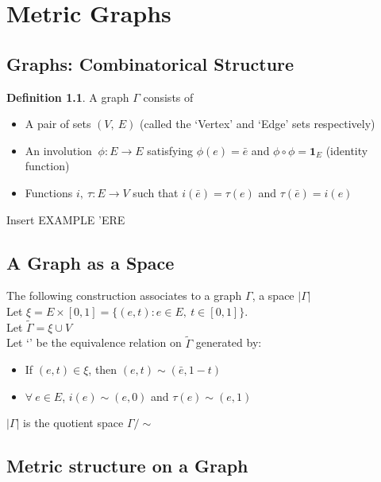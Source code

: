 \documentclass[a4paper,10pt]{book}
\theoremstyle{definition}
\newtheorem{definition}[theorem]{Definition}
\theoremstyle{remark}
\numberwithin{section}{chapter}
\numberwithin{equation}{chapter}
\begin{document}
 
 \chapter{Metric Graphs}
 \section{Graphs: Combinatorical Structure}
 
 \begin{definition}
  A graph \emph{$\Gamma$} consists of
  
  \begin{itemize}
   \item A pair of sets $(V,\ E)$ (called the `Vertex' and `Edge' sets respectively)
   \item An involution  $\: \phi \colon E \rightarrow E$
               satisfying $\phi (e) = \bar{e} $ and $\phi\circ\phi = \mathbf{1}_E$ (identity function)
   \item Functions $i,\ \tau: E \rightarrow V$ such that $i(\bar{e}) = \tau (e) $ and $\tau(\bar{e}) = i(e)$
  \end{itemize}

 \end{definition}

 Insert EXAMPLE 'ERE
 
 \section{A Graph as a Space}

   The following construction associates to a graph $\Gamma$, a space $| \Gamma |$ 
   \vspace{0.1in} \\ Let $ \xi = E \times [0,1] = \{ (e,t) : e \in E,\ t \in [0,1]\} $.\\
   Let $ \widetilde{\Gamma} =  \xi \cup V $ \\
   Let `\texttildelow' be the equivalence relation on $ \widetilde{\Gamma} $ generated by: 
   \begin{itemize}
      \item If $ (e,t) \in \xi $, then $ (e,t) \sim (\bar{e},1-t) $
      \item $ \forall \ e \in E $, $ i(e) \sim (e,0) $ and $ \tau (e) \sim (e,1) $
   \end{itemize}
   $ |\Gamma| $ is the quotient space $ \Gamma / \sim $
   \section{ Metric structure on a Graph}
   
\end{document}
